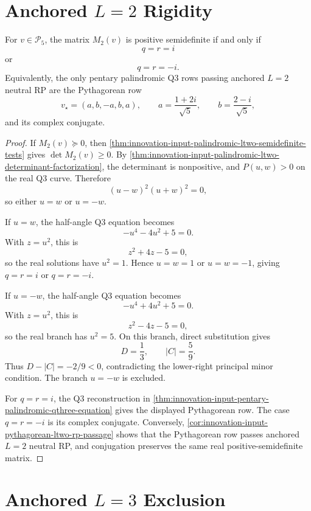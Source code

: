 \section{Anchored $L=2$ Rigidity}
\label{sec:innovation-input-palindromic-ltwo-rigidity}

\begin{theorem}[Palindromic $L=2$ rigidity]
\label{thm:innovation-input-palindromic-ltwo-rigidity}
For $v\in\mathcal P_5$, the matrix $M_2(v)$ is positive semidefinite if
and only if
$$
q=r=i
$$
or
$$
q=r=-i.
$$
Equivalently, the only pentary palindromic Q3 rows passing anchored
$L=2$ neutral RP are the Pythagorean row
$$
v_\star=(a,b,-a,b,a),
\qquad
a=\frac{1+2i}{\sqrt5},
\qquad
b=\frac{2-i}{\sqrt5},
$$
and its complex conjugate.
\end{theorem}

\begin{proof}
If $M_2(v)\succeq0$, then
\autoref{thm:innovation-input-palindromic-ltwo-semidefinite-tests} gives
$\det M_2(v)\ge0$. By
\autoref{thm:innovation-input-palindromic-ltwo-determinant-factorization},
the determinant is nonpositive, and $P(u,w)>0$ on the real Q3 curve.
Therefore
$$
(u-w)^2(u+w)^2=0,
$$
so either $u=w$ or $u=-w$.

If $u=w$, the half-angle Q3 equation becomes
$$
-u^4-4u^2+5=0.
$$
With $z=u^2$, this is
$$
z^2+4z-5=0,
$$
so the real solutions have $u^2=1$. Hence $u=w=1$ or $u=w=-1$, giving
$q=r=i$ or $q=r=-i$.

If $u=-w$, the half-angle Q3 equation becomes
$$
-u^4+4u^2+5=0.
$$
With $z=u^2$, this is
$$
z^2-4z-5=0,
$$
so the real branch has $u^2=5$. On this branch, direct substitution gives
$$
D=\frac13,
\qquad
|C|=\frac59.
$$
Thus $D-|C|=-2/9<0$, contradicting the lower-right principal minor
condition. The branch $u=-w$ is excluded.

For $q=r=i$, the Q3 reconstruction in
\autoref{thm:innovation-input-pentary-palindromic-qthree-equation} gives
the displayed Pythagorean row. The case $q=r=-i$ is its complex
conjugate. Conversely,
\autoref{cor:innovation-input-pythagorean-ltwo-rp-passage} shows that the
Pythagorean row passes anchored $L=2$ neutral RP, and conjugation preserves
the same real positive-semidefinite matrix.
\end{proof}

\section{Anchored $L=3$ Exclusion}
\label{sec:innovation-input-palindromic-lthree-exclusion}


